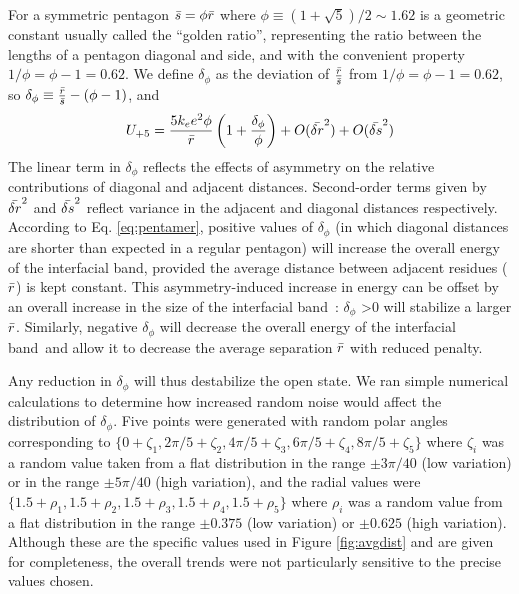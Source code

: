 \documentclass[9pt,onecolumn,oneside,lineno]{pnas-new}
\newcommand{\fivering}{interfacial band~}
\newcommand{\fiveringnos}{interfacial band}
\begin{document}
 For a symmetric pentagon $\bar{s} = \phi\bar{r}$ where $\phi \equiv \left(1 + \sqrt{5}\right)/2\sim 1.62$ is a geometric constant usually called the ``golden ratio'', representing the ratio between the lengths of a pentagon diagonal and side, and with the convenient property $1/\phi = \phi - 1=0.62$.  We define $\delta_{\phi}$ as the deviation of $\frac{\bar{r}}{\bar{s}}$ from $1/\phi =  \phi - 1=0.62$, so $ {\delta_{\phi}}\equiv \frac{\bar{r}}{\bar{s}} -(\phi - 1)$, and 
\begin{eqnarray}
U_{+5} = \frac{ 5 k_{e} e^{2}\phi}{\bar{r}}\left( 1+ \frac{\delta_{\phi}}{\phi} \right) + O(\bar{\delta r}^{2})+ O(\bar{\delta s}^{2})
 \label{eq:pentamer}
\end{eqnarray} 
The linear term in $\delta_{\phi}$ reflects the effects of asymmetry on the relative contributions of diagonal and adjacent distances.   Second-order terms given by $\bar{\delta r}^{2}$ and $\bar{\delta s}^{2}$ reflect variance in the adjacent and diagonal distances respectively.  According to Eq. \ref{eq:pentamer}, positive values of $\delta_{\phi}$ (in which diagonal distances are shorter than expected in a regular pentagon) will increase the overall energy of the \fiveringnos, provided the average distance between adjacent residues ($\bar{r}$) is kept constant.  This asymmetry-induced increase in energy can be offset by an overall increase in the size of the \fivering: $\delta_{\phi}$ >0  will stabilize a larger $\bar{r}$.  Similarly, negative $\delta_{\phi}$ will decrease the overall energy of the \fivering and allow it to decrease the average separation $\bar{r}$ with reduced penalty.  

Any reduction in $\delta_{\phi}$ will thus destabilize the open state. We ran simple numerical calculations to determine how increased random noise would affect the distribution of $\delta_{\phi}$.  Five points were generated with random polar angles corresponding to $\{0+\zeta_{1}, 2 \pi/5 + \zeta_{2}, 4 \pi/5 + \zeta_{3}, 6 \pi/5+ \zeta_{4}, 8 \pi/5+ \zeta_{5}\}$ where $\zeta_{i}$ was a random value taken from a flat distribution in the range $\pm 3\pi/40$ (low variation) or in the range  $\pm 5\pi/40$ (high variation), and the radial values were $\{1.5+\rho_{1}, 1.5 + \rho_{2}, 1.5 + \rho_{3},1.5+ \rho_{4},1.5+\rho_{5}\}$  where $\rho_{i}$ was a random value from a flat distribution in the range $\pm 0.375$ (low variation) or $\pm 0.625$ (high variation).  Although these are the specific values used in Figure \ref{fig:avgdist} and are given for completeness,  the overall trends were not particularly sensitive to the precise values chosen.  
\end{document}
